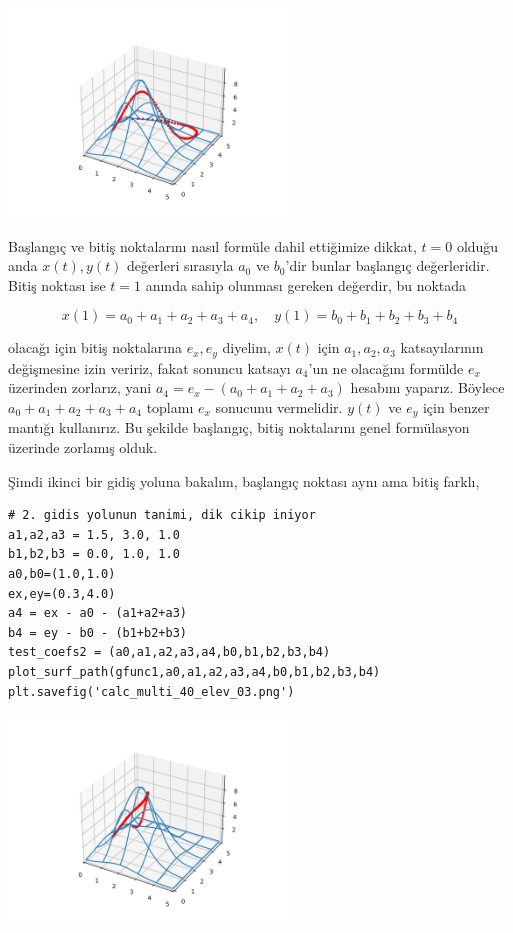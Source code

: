 \documentclass[12pt,fleqn]{article}\usepackage{../../common}
\begin{document}
\includegraphics[width=20em]{calc_multi_40_elev_01.png}

Başlangıç ve bitiş noktalarını nasıl formüle dahil ettiğimize dikkat, $t=0$
olduğu anda $x(t),y(t)$ değerleri sırasıyla $a_0$ ve $b_0$'dir bunlar başlangıç
değerleridir. Bitiş noktası ise $t=1$ anında sahip olunması gereken değerdir,
bu noktada

$$
x(1) = a_0 + a_1 + a_2 + a_3 + a_4 ,\quad
y(1) = b_0 + b_1 + b_2 + b_3 + b_4 
$$

olacağı için bitiş noktalarına $e_x,e_y$ diyelim, $x(t)$ için $a_1,a_2,a_3$
katsayılarının değişmesine izin veririz, fakat sonuncu katsayı $a_4$'un ne
olacağını formülde $e_x$ üzerinden zorlarız, yani $a_4 = e_x - (a_0 + a_1 + a_2
+ a_3)$ hesabını yaparız. Böylece $a_0 + a_1 + a_2 + a_3 + a_4$ toplamı $e_x$
sonucunu vermelidir. $y(t)$ ve $e_y$ için benzer mantığı kullanırız.  Bu şekilde
başlangıç, bitiş noktalarını genel formülasyon üzerinde zorlamış olduk.

Şimdi ikinci bir gidiş yoluna bakalım, başlangıç noktası aynı ama bitiş farklı,

\begin{verbatim}
# 2. gidis yolunun tanimi, dik cikip iniyor
a1,a2,a3 = 1.5, 3.0, 1.0
b1,b2,b3 = 0.0, 1.0, 1.0
a0,b0=(1.0,1.0)
ex,ey=(0.3,4.0)
a4 = ex - a0 - (a1+a2+a3)
b4 = ey - b0 - (b1+b2+b3)
test_coefs2 = (a0,a1,a2,a3,a4,b0,b1,b2,b3,b4)
plot_surf_path(gfunc1,a0,a1,a2,a3,a4,b0,b1,b2,b3,b4)
plt.savefig('calc_multi_40_elev_03.png')
\end{verbatim}

\includegraphics[width=20em]{calc_multi_40_elev_03.png}
\end{document}
